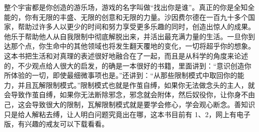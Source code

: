 \begin{book}
    整个宇宙都是你创造的游乐场，游戏的名字叫做“找出你是谁”。真正的你是全知全能的，你有无限的丰盛、无限的创意和无限的力量。沙因费尔德在一百九十多个国家，帮助过许多人以更少的时间和努力享受更多乐趣的同时，创造出惊人的成果。他乐于帮助他人从自我限制中彻底解脱出来，并活出最充满力量的生活。一旦你到达那个点，你生命中的其他领域也将发生翻天覆地的变化，一切将超乎你的想象。这本书把生活和对真理的表述很好地融合在了一起，而且是从科学的角度来论述的，不少观点给人很大的启发，的确是一本很好的书籍，里面讲到：“意识创造你所体验的一切，即使最细微事项也是。”还讲到：“从那些限制模式中取回你的能力，并且瓦解限制模式。”限制模式也就是作茧自缚，如果你无法做念头的主人，就会导致作茧自缚，如果你无法断除邪念，邪念就会附体，然后奴役你，让你身不由己，这会导致很大的限制，瓦解限制模式就是要学会修心，学会观心断念。善知识只是给人解粘去缚，让人明白问题究竟出在哪，这本书目前有 1、2，网上有电子版，有兴趣的戒友可以下载看看。
\end{book}

